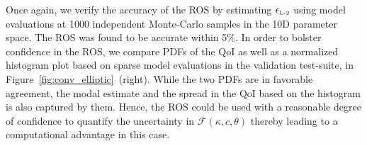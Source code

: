 Once again, we verify the accuracy of the ROS by estimating $\epsilon_{\mbox{\tiny{L-2}}}$
using model evaluations at 1000 independent Monte-Carlo samples in the 10D parameter
space. The ROS was found to be accurate
within 5$\%$. In order to bolster confidence in the ROS, we compare PDFs of the QoI
as well as a normalized histogram plot based on sparse model evaluations in the  
validation test-suite, in 
Figure~\ref{fig:conv_elliptic}~(right). While the two PDFs are in favorable agreement,
the modal estimate and the spread in the QoI based on the histogram is also captured
by them. Hence, the ROS could be used with a reasonable degree of confidence to
quantify the uncertainty in $\mathcal{F}(\kappa, c, \theta)$ thereby leading to
a computational advantage in this case.































